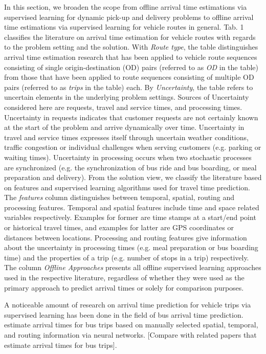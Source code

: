In this section, we broaden the scope from offline arrival time estimations via supervised learning for dynamic pick-up and delivery problems to offline arrival time estimations via supervised learning for vehicle routes in general.
Tab. 1 classifies the literature on arrival time estimation for vehicle routes with regards to the problem setting and the solution.
With \textit{Route type}, the table distinguishes arrival time estimation research that has been applied to vehicle route sequences consisting of single origin-destination (OD) pairs (referred to as \textit{OD} in the table) from those that have been applied to route sequences consisting of multiple OD pairs (referred to as \textit{trips} in the table) each.
By \textit{Uncertainty}, the table refers to uncertain elements in the underlying problem settings. Sources of Uncertainty considered here are requests, travel and service times, and processing times. Uncertainty in requests indicates that customer requests are not certainly known at the start of the problem and arrive dynamically over time. Uncertainty in travel and service times expresses itself through uncertain weather conditions, traffic congestion or individual challenges when serving customers (e.g. parking or waiting times). Uncertainty in processing occurs when two stochastic processes are synchronized (e.g. the synchronization of bus ride and bus boarding, or meal preparation and delivery). From the solution view, we classify the literature based on features and supervised learning algorithms used for travel time prediction. The \textit{features} column distinguishes between temporal, spatial, routing and processing features.
Temporal and spatial features include time and space related variables respectively. Examples for former are time stamps at a start/end point or historical travel times, and examples for latter are GPS coordinates or distances between locations. Processing and routing features give information about the uncertainty in processing times (e.g. meal preparation or bus boarding time) and the properties of a trip (e.g. number of stops in a trip) respectively.
The column \textit{Offline Approaches} presents all offline supervised learning approaches used in the respective literature, regardless of whether they were used as the primary approach to predict arrival times or solely for comparison purposes. 

A noticeable amount of research on arrival time prediction for vehicle trips via supervised learning has been done in the field of bus arrival time prediction. \cite{Chen2004_ANNKalman} estimate arrival times for bus trips based on manually selected spatial, temporal, and routing information via neural networks. [Compare with related papers that estimate arrival times for bus trips].

